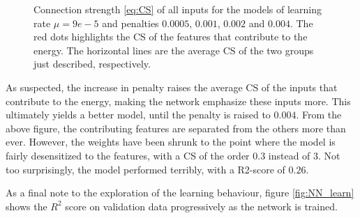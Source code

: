 \begin{figure}[H]
\qquad
{}
\caption{Connection strength \autoref{eq:CS} of all inputs for the models of learning rate $\mu = 9e-5$ and penalties $0.0005$, $0.001$, $0.002$ and $0.004$. The red dots highlights the CS of the features that contribute to the energy. The horizontal lines are the average CS of the two groups just described, respectively.}
\label{fig:NN_CS}
\end{figure}

As suspected, the increase in penalty raises the average CS of the inputs that contribute to the energy, making the network emphasize these inputs more. This ultimately yields a better model, until the penalty is raised to $0.004$. From the above figure, the contributing features are separated from the others more than ever. However, the weights have been shrunk to the point where the model is fairly desensitized to the features, with a CS of the order 0.3 instead of 3. Not too surprisingly, the model performed terribly, with a R2-score of $0.26$.

As a final note to the exploration of the learning behaviour, figure \autoref{fig:NN_learn} shows the $R^2$ score on validation data progressively as the network is trained.

